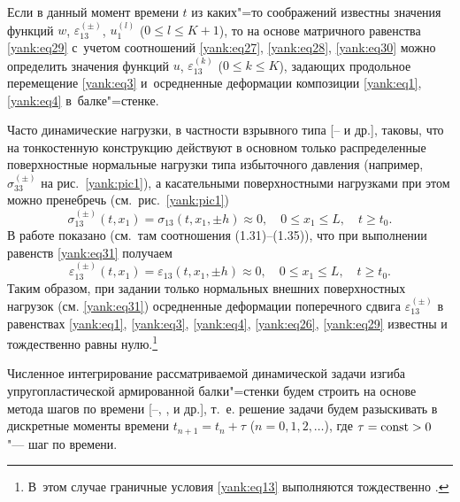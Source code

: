 Если в данный момент времени $t$ из каких"=то соображений известны значения
функций $w$, $\varepsilon _{13}^{(\pm )}$, $u_1^{(l)}$ ($0\le l\le K+1$), то
на основе матричного равенства \eqref{yank:eq29} с~учетом соотношений \eqref{yank:eq27}, \eqref{yank:eq28}, \eqref{yank:eq30}
можно определить значения функций $u$, $\varepsilon _{13}^{(k)}$ ($0\le k\le K$), задающих продольное перемещение \eqref{yank:eq3} и~осредненные деформации композиции
\eqref{yank:eq1}, \eqref{yank:eq4} в~балке"=стенке.

Часто динамические нагрузки, в частности взрывного типа [-- и др.],
таковы, что на тонкостенную конструкцию действуют в основном только
распределенные поверхностные нормальные нагрузки типа избыточного давления
(например, $\sigma _{33}^{(\pm )}$ на рис.~\ref{yank:pic1}), а касательными
поверхностными нагрузками при этом можно пренебречь (см.~рис.~\ref{yank:pic1})
\begin{equation}
\label{yank:eq31}
\sigma _{13}^{(\pm )} (t,x_1)=\sigma _{13} (t,x_1,\pm h )\approx 0,\quad 0\le x_1 \le L,\quad t\ge t_0.
\end{equation}
В работе \cite{yank:bib13} показано (см.~там соотношения (1.31)--(1.35)), что при
выполнении равенств \eqref{yank:eq31} получаем \begin{equation}
\label{yank:eq32}
\varepsilon _{13}^{(\pm )} (t,x_1)=\varepsilon _{13}
(t,x_1,\pm h )\approx 0,\quad 0\le x_1 \le L,\quad t\ge t_0.
\end{equation}
Таким образом, при задании только нормальных внешних поверхностных нагрузок
(см. \eqref{yank:eq31}) осредненные деформации поперечного сдвига $\varepsilon
_{13}^{(\pm )} $ в равенствах \eqref{yank:eq1}, \eqref{yank:eq3}, \eqref{yank:eq4}, \eqref{yank:eq26}, \eqref{yank:eq29} известны и
тождественно равны нулю.\footnote{В~этом случае граничные условия \eqref{yank:eq13} выполняются
тождественно \cite{yank:bib13}.}

\smallskip

\hypertarget{yan:sec2}{}

 Численное интегрирование рассматриваемой
динамической задачи изгиба упругопластической армированной балки"=стенки
будем строить на основе метода шагов по времени [--, ,  и др.], т.~е.
решение задачи будем разыскивать в дискретные моменты времени $t_{n+1} =t_n
+\tau$ ($n=0,1,2,\ldots$), где $\tau ={\rm const}>0$ "--- шаг по
времени.

